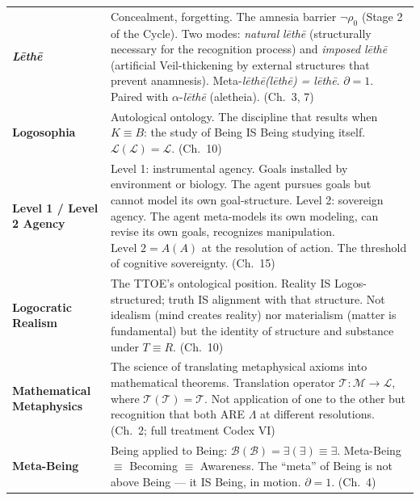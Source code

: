 \documentclass[10pt, openany, oneside]{book}
\renewcommand{\footnotesize}{\fontsize{8.5}{11}\selectfont}
\begin{document}
\newpage

{\footnotesize
\noindent\begin{tabular}{@{} l @{\hspace{0.6em}} p{} @{}}
\textbf{\textit{L\={e}th\={e}}} & Concealment, forgetting. The amnesia barrier $\neg\rho_0$ (Stage 2 of the Cycle). Two modes: \textit{natural} \textit{l\={e}th\={e}} (structurally necessary for the recognition process) and \textit{imposed} \textit{l\={e}th\={e}} (artificial Veil-thickening by external structures that prevent anamnesis). Meta-\textit{l\={e}th\={e}(l\={e}th\={e}) = l\={e}th\={e}}. $\partial = 1$. Paired with $\alpha$-\textit{l\={e}th\={e}} (aletheia). (Ch.\ 3, 7) \\[0.3em]
\textbf{Logosophia} & Autological ontology. The discipline that results when $K \equiv B$: the study of Being IS Being studying itself. $\mathcal{L}(\mathcal{L}) = \mathcal{L}$. (Ch.\ 10) \\[0.3em]
\textbf{Level 1 / Level 2 Agency} & Level 1: instrumental agency. Goals installed by environment or biology. The agent pursues goals but cannot model its own goal-structure. Level 2: sovereign agency. The agent meta-models its own modeling, can revise its own goals, recognizes manipulation. $\text{Level 2} = A(A)$ at the resolution of action. The threshold of cognitive sovereignty. (Ch.\ 15) \\[0.3em]
\textbf{Logocratic Realism} & The TTOE's ontological position. Reality IS Logos-structured; truth IS alignment with that structure. Not idealism (mind creates reality) nor materialism (matter is fundamental) but the identity of structure and substance under $T \equiv R$. (Ch.\ 10) \\[0.3em]
\textbf{Mathematical Metaphysics} & The science of translating metaphysical axioms into mathematical theorems. Translation operator $\mathcal{T}: \mathcal{M} \to \mathcal{L}$, where $\mathcal{T}(\mathcal{T}) = \mathcal{T}$. Not application of one to the other but recognition that both ARE $\Lambda$ at different resolutions. (Ch.\ 2; full treatment Codex VI) \\[0.3em]
\textbf{Meta-Being} & Being applied to Being: $\mathcal{B}(\mathcal{B}) = \exists(\exists) \equiv \exists$. Meta-Being $\equiv$ Becoming $\equiv$ Awareness. The ``meta'' of Being is not above Being --- it IS Being, in motion. $\partial = 1$. (Ch.\ 4) \\[0.3em]
\end{tabular}
}
\end{document}
